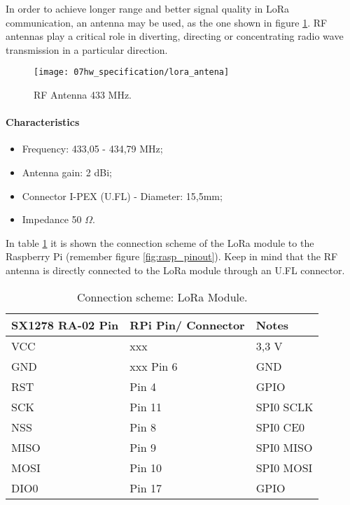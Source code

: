 In order to achieve longer range and better signal quality in LoRa communication, an antenna may be used, as the one shown in figure \ref{fig:lora_antena}. RF antennas play a critical role in diverting, directing or concentrating radio wave transmission in a particular direction. 


\begin{figure}[H]
	\centering
	\texttt{[image: 07hw\_specification/lora\_antena]}
	\caption{RF Antenna 433 MHz.}
	\label{fig:lora_antena}
\end{figure}

\paragraph*{Characteristics}
\begin{itemize}
	\item Frequency: 433,05 - 434,79 MHz;
	\item Antenna gain: 2 dBi;
	\item Connector I-PEX (U.FL) - Diameter: 15,5mm;
	\item Impedance 50 $\Omega$.
\end{itemize}


In table \ref{table:connect_lora} it is shown the connection scheme of the LoRa module to the Raspberry Pi (remember figure \ref{fig:rasp_pinout}). Keep in mind that the RF antenna is directly connected to the LoRa module through an U.FL connector.

\begin{table}[H]
	\centering
	\begin{tabular}{|m{4cm}|m{5cm}|m{3cm}|}
		\hline
		\textbf{SX1278 RA-02 Pin} & \textbf{RPi Pin/ Connector} & \textbf{Notes} 
		\\\hline\hline
		
		VCC & xxx & 3,3 V
		\\\hline
		GND & xxx Pin 6 & GND
		\\\hline
		RST & Pin 4 & GPIO
		\\\hline
		SCK & Pin 11 & SPI0 SCLK
		\\\hline
		NSS & Pin 8 & SPI0 CE0
		\\\hline
		MISO & Pin 9 & SPI0 MISO
		\\\hline
		MOSI & Pin 10 & SPI0 MOSI
		\\\hline
		DIO0 & Pin 17 & GPIO
		\\\hline
	\end{tabular}
	
	\caption{Connection scheme: LoRa Module.}
	\label{table:connect_lora}
\end{table}

